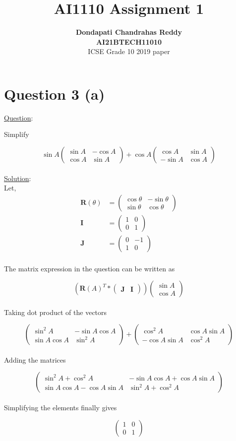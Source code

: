 \documentclass[journal,12pt,twocolumn]{IEEEtran}
\newcommand{\myvec}[1]{\ensuremath{\begin{pmatrix}#1\end{pmatrix}}}
\let\vec\mathbf
\begin{document}
\title{\textbf{AI1110 Assignment 1} }
\author{\textbf{Dondapati Chandrahas Reddy}\\ \textbf{AI21BTECH11010}\\ ICSE Grade 10 2019 paper}

\maketitle

{\section {Question 3 (a) \newline}}

{\large \underline{Question}:\newline}

Simplify

\begin{equation}
	\sin A\myvec{\sin A &  -\cos A \\ \cos A & \sin A} + \cos A \myvec{\cos A &  \sin A \\ -\sin A & \cos A}
\end{equation}\\

{\large \underline{Solution}:}\\

Let,
\begin{align}
	\vec{R}(\theta) &= \myvec{\cos \theta &  -\sin \theta \\ \sin \theta & \cos \theta} \\[1em] \vec{I} &= \myvec{1 & 0 \\ 0 & 1} \\[1em] \vec{J} &= \myvec{0 & -1 \\ 1 & 0}
\end{align}\\

The matrix expression in the question can be written as

\begin{equation}
	\left(\vec{R}(A)^T * \myvec{\vec{J} & \vec{I}}\right) \myvec{\sin A \\ \cos A}
\end{equation}\\

Taking dot product of the vectors

\begin{equation}
	\myvec{\sin^2 A &  -\sin A\cos A \\ \sin A\cos A & \sin^2 A} +\myvec{\cos^2 A & \cos A\sin A \\ -\cos A\sin A & \cos^2 A}
\end{equation}\\

Adding the matrices

\begin{equation}
	\myvec{\sin^2 A + \cos^2 A &  -\sin A \cos A +\cos A \sin A \\ \sin A \cos A -\cos A \sin A & \sin^2 A + \cos^2 A}
\end{equation}\\

Simplifying the elements finally gives

\begin{equation}
	\myvec{1 & 0 \\ 0 & 1}
\end{equation}\\
\end{document}
